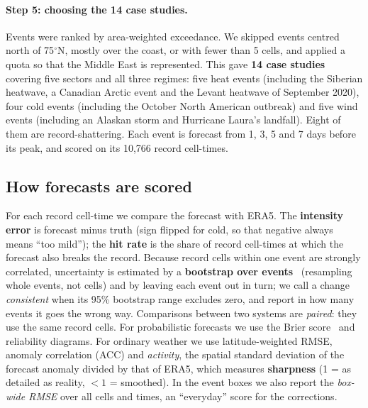 \documentclass{article}
\begin{document}
\paragraph{Step 5: choosing the 14 case studies.}
Events were ranked by area-weighted exceedance. We skipped events centred north of 75$^\circ$N, mostly over the coast, or with fewer than 5 cells, and
applied a quota so that the Middle East is represented. This gave \textbf{14 case studies} covering five sectors and all three regimes:
five heat events (including the Siberian heatwave, a Canadian Arctic event and the Levant heatwave of September 2020), four cold events (including the
October North American outbreak) and five wind events (including an Alaskan storm and Hurricane Laura's landfall). Eight of them are record-shattering. Each event is forecast
from 1, 3, 5 and 7 days before its peak, and scored on its 10{,}766 record cell-times.

\subsection{How forecasts are scored}
\label{sec:scores}
For each record cell-time we compare the forecast with ERA5. The \textbf{intensity error} is forecast minus truth (sign flipped for cold,
so that negative always means ``too mild''); the \textbf{hit rate} is the share of record cell-times at which the forecast also breaks the record.
Because record cells within one event are strongly correlated, uncertainty is estimated by a \textbf{bootstrap over events}~\cite{efron1994bootstrap}
(resampling whole events, not cells) and by leaving each event out in turn; we call a change \emph{consistent} when its 95\% bootstrap range excludes zero, and report
in how many events it goes the wrong way. Comparisons between two systems are \emph{paired}: they use the same
record cells. For probabilistic forecasts we use the Brier score~\cite{brier1950verification} and reliability diagrams.
For ordinary weather we use latitude-weighted RMSE, anomaly correlation (ACC) and \emph{activity}, the
spatial standard deviation of the forecast anomaly divided by that of ERA5, which measures \textbf{sharpness} (1 = as detailed as reality, $<1$ = smoothed).
In the event boxes we also report the \emph{box-wide RMSE} over all cells and times, an ``everyday'' score for the corrections.
\end{document}
